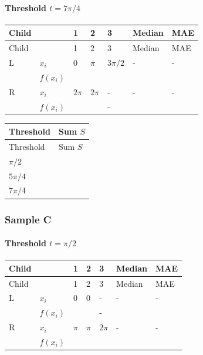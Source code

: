 \documentclass{course_sheet}
\begin{document}
\paragraph*{Threshold $t=7\pi/4$}
\begingroup
\small
\setlength{\tabcolsep}{4pt}
\begin{longtable}{l|l|l|l|l|l|l}
Child &  & 1 & 2 & 3 & Median & MAE \\
\hline
\endfirsthead
Child &  & 1 & 2 & 3 & Median & MAE \\
\hline
\endhead
L & $x_i$ & $0$ & $\pi$ & $3\pi/2$ & - & - \\[3pt]
 & $f(x_i)$ & $\phantom{0}$ & $\phantom{0}$ & $\phantom{0}$ & $\phantom{0}$ & $\phantom{0}$ \\[3pt]
R & $x_i$ & $2\pi$ & $2\pi$ & - & - & - \\[3pt]
 & $f(x_i)$ & $\phantom{0}$ & $\phantom{0}$ & - & $\phantom{0}$ & $\phantom{0}$ \\[3pt]
\end{longtable}
\endgroup
\begingroup
\small
\setlength{\tabcolsep}{4pt}
\begin{longtable}{l|l}
Threshold & Sum $S$ \\
\hline
\endfirsthead
Threshold & Sum $S$ \\
\hline
\endhead
$\pi/2$ & $\phantom{0}$ \\[3pt]
$5\pi/4$ & $\phantom{0}$ \\[3pt]
$7\pi/4$ & $\phantom{0}$ \\[3pt]
\end{longtable}
\endgroup
\subsubsection*{Sample C}
\paragraph*{Threshold $t=\pi/2$}
\begingroup
\small
\setlength{\tabcolsep}{4pt}
\begin{longtable}{l|l|l|l|l|l|l}
Child &  & 1 & 2 & 3 & Median & MAE \\
\hline
\endfirsthead
Child &  & 1 & 2 & 3 & Median & MAE \\
\hline
\endhead
L & $x_i$ & $0$ & $0$ & - & - & - \\[3pt]
 & $f(x_i)$ & $\phantom{0}$ & $\phantom{0}$ & - & $\phantom{0}$ & $\phantom{0}$ \\[3pt]
R & $x_i$ & $\pi$ & $\pi$ & $2\pi$ & - & - \\[3pt]
 & $f(x_i)$ & $\phantom{0}$ & $\phantom{0}$ & $\phantom{0}$ & $\phantom{0}$ & $\phantom{0}$ \\[3pt]
\end{longtable}
\endgroup
\end{document}
